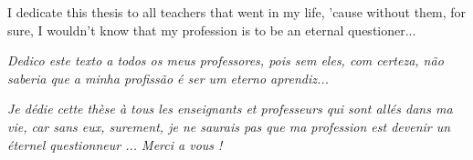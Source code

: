 
\begin{dedicatoria}

I dedicate this thesis to all teachers that went in my life, 'cause without them, for sure, I wouldn't know that my profession is to be an eternal questioner...

\textit{Dedico este texto a todos os meus professores, pois sem eles, com certeza, não saberia que a minha profissão é ser um eterno aprendiz...}

\textit{Je dédie cette thèse à tous les enseignants et professeurs qui sont allés dans ma vie, car sans eux, surement, je ne saurais pas que ma profession est devenir un éternel questionneur ... Merci a vous !}

\end{dedicatoria}
